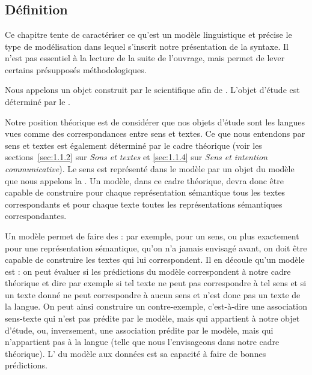 \chapter{}\label{sec:1.3}

\section{Définition}\label{sec:1.3.0}

Ce chapitre tente de caractériser ce qu’est un modèle linguistique et précise le type de modélisation dans lequel s’inscrit notre présentation de la syntaxe. Il n’est pas essentiel à la lecture de la suite de l’ouvrage, mais permet de lever certains présupposés méthodologiques.

{Nous appelons  un objet construit par le scientifique afin de  . L’objet d’étude est déterminé par le .}

Notre position théorique est de considérer que nos objets d’étude sont les langues vues comme des correspondances entre sens et textes. Ce que nous entendons par sens et textes est également déterminé par le cadre théorique (voir les sections~\ref{sec:1.1.2} sur \textit{Sons et textes} et \ref{sec:1.1.4} sur \textit{Sens et intention communicative}). Le sens est représenté dans le modèle par un objet du modèle que nous appelons la . Un modèle, dans ce cadre théorique, devra donc être capable de construire pour chaque représentation sémantique tous les textes correspondants et pour chaque texte toutes les représentations sémantiques correspondantes.

Un modèle permet de faire des  : par exemple, pour un sens, ou plus exactement pour une représentation sémantique, qu’on n’a jamais envisagé avant, on doit être capable de construire les textes qui lui correspondent. Il en découle qu’un modèle est  : on peut évaluer si les prédictions du modèle correspondent à notre cadre théorique et dire par exemple si tel texte ne peut pas correspondre à tel sens et si un texte donné ne peut correspondre à aucun sens et n’est donc pas un texte de la langue. On peut ainsi construire un contre-exemple, c’est-à-dire une association sens-texte qui n’est pas prédite par le modèle, mais qui appartient à notre objet d’étude, ou, inversement, une association prédite par le modèle, mais qui n’appartient pas à la langue (telle que nous l’envisageons dans notre cadre théorique). L’ du modèle aux données est sa capacité à faire de bonnes prédictions.

